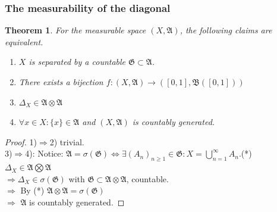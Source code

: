 \documentclass[a4paper,11pt,oneside,fleqn]{book}
\newtheorem{theorem}{Theorem}[section]
\theoremstyle{definition}
\theoremstyle{remark}
\begin{document}
\subsubsection{The measurability of the diagonal}
\begin{theorem}
	For the measurable space $(X, \mathfrak{A})$, the following claims are equivalent.
	\begin{enumerate}
		\item $X$ is separated by a countable $\mathfrak{G} \subset \mathfrak{A}$.
		\item There exists a bijection $f: (X, \mathfrak{A}) \rightarrow ([0, 1], \mathfrak{B}([0, 1]))$
		\item $\Delta_X \in \mathfrak{A} \otimes \mathfrak{A}$ 
		\item $\forall x \in X: \{x\} \in \mathfrak{A}$ and $(X, \mathfrak{A})$ is countably generated.
	\end{enumerate}
\end{theorem}
\begin{proof}
1)$\Rightarrow$2) trivial. \\
	3)$\Rightarrow$4): Notice: $\mathfrak{A} = \sigma(\mathfrak{G}) \Leftrightarrow \exists (A_n)_{n \geq 1} \in \mathfrak{G}: X = \bigcup_{n = 1}^\infty A_n$.(*)\\ 
	$\Delta_X \in \mathfrak{A} \bigotimes \mathfrak{A}$\\
	 $\Rightarrow \Delta_X \in \sigma(\mathfrak{G})$ with $\mathfrak{G} \subset \mathfrak{A} \otimes \mathfrak{A}$, countable.\\
	$\Rightarrow$ By (*) $\mathfrak{A} \otimes \mathfrak{A} = \sigma (\mathfrak{G})$\\
	$\Rightarrow$ $\mathfrak{A}$ is countably generated.
\end{proof}
\end{document}
